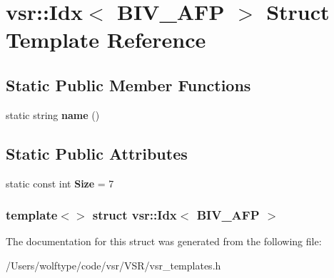 \hypertarget{structvsr_1_1_idx_3_01_b_i_v___a_f_p_01_4}{\section{vsr\-:\-:Idx$<$ B\-I\-V\-\_\-\-A\-F\-P $>$ Struct Template Reference}
\label{structvsr_1_1_idx_3_01_b_i_v___a_f_p_01_4}
}
\subsection*{Static Public Member Functions}
\begin{DoxyCompactItemize}
\item 
\hypertarget{structvsr_1_1_idx_3_01_b_i_v___a_f_p_01_4_aab4a1c2ac54aedae18634731cd6462e7}{static string {\bfseries name} ()}\label{structvsr_1_1_idx_3_01_b_i_v___a_f_p_01_4_aab4a1c2ac54aedae18634731cd6462e7}

\end{DoxyCompactItemize}
\subsection*{Static Public Attributes}
\begin{DoxyCompactItemize}
\item 
\hypertarget{structvsr_1_1_idx_3_01_b_i_v___a_f_p_01_4_ac36e2e013be1b30b9422be25aa686409}{static const int {\bfseries Size} = 7}\label{structvsr_1_1_idx_3_01_b_i_v___a_f_p_01_4_ac36e2e013be1b30b9422be25aa686409}

\end{DoxyCompactItemize}
\subsubsection*{template$<$$>$ struct vsr\-::\-Idx$<$ B\-I\-V\-\_\-\-A\-F\-P $>$}



The documentation for this struct was generated from the following file\-:\begin{DoxyCompactItemize}
\item 
/\-Users/wolftype/code/vsr/\-V\-S\-R/vsr\-\_\-templates.\-h\end{DoxyCompactItemize}
